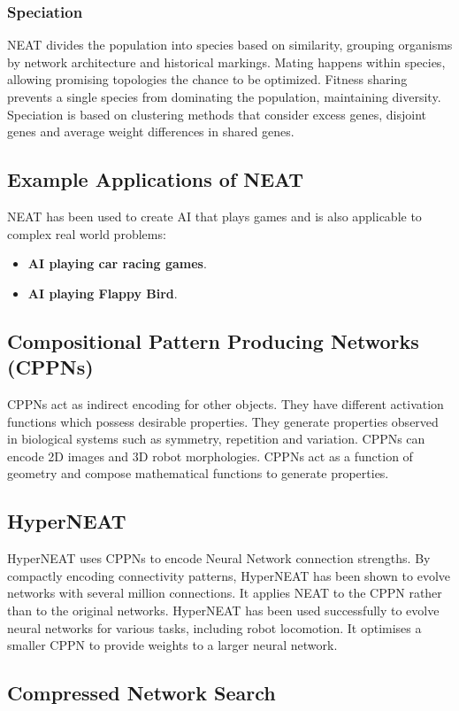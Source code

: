 \subsubsection*{Speciation}
NEAT divides the population into species based on similarity, grouping organisms by network architecture and historical markings. Mating happens within species, allowing promising topologies the chance to be optimized. Fitness sharing prevents a single species from dominating the population, maintaining diversity. Speciation is based on clustering methods that consider excess genes, disjoint genes and average weight differences in shared genes.
\subsection*{Example Applications of NEAT}
NEAT has been used to create AI that plays games and is also applicable to complex real world problems:
\begin{itemize}
    \item \textbf{AI playing car racing games}.
    \item \textbf{AI playing Flappy Bird}.
\end{itemize}
\subsection*{Compositional Pattern Producing Networks (CPPNs)}

CPPNs act as indirect encoding for other objects. They have different activation functions which possess desirable properties. They generate properties observed in biological systems such as symmetry, repetition and variation.  CPPNs can encode 2D images and 3D robot morphologies.  CPPNs act as a function of geometry and compose mathematical functions to generate properties.

\subsection*{HyperNEAT}
HyperNEAT uses CPPNs to encode Neural Network connection strengths.  By compactly encoding connectivity patterns, HyperNEAT has been shown to evolve networks with several million connections. It applies NEAT to the CPPN rather than to the original networks.  HyperNEAT has been used successfully to evolve neural networks for various tasks, including robot locomotion.  It optimises a smaller CPPN to provide weights to a larger neural network.
\subsection*{Compressed Network Search}

